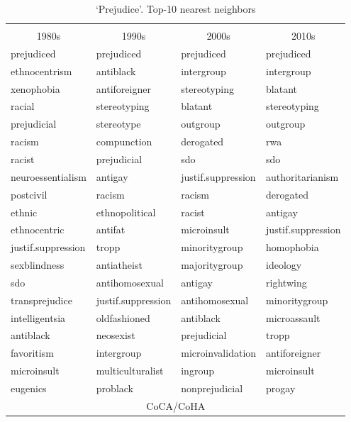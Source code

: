 \documentclass[output=paper]{langsci/langscibook}
\begin{document}
\begin{table}
\footnotesize
\caption{`Prejudice'. Top-10 nearest neighbors\label{tab:prejudice-nns}}
 \begin{tabular}{llll}
  \lsptoprule
\multicolumn{4}{c}{Psychology}\\
\multicolumn{1}{c}{1980s} & \multicolumn{1}{c}{1990s}  & \multicolumn{1}{c}{2000s} & \multicolumn{1}{c}{2010s}\\\midrule
prejudiced&prejudiced&prejudiced&prejudiced                   \\
ethnocentrism&antiblack&intergroup&intergroup                 \\
xenophobia&antiforeigner&stereotyping&blatant                 \\
racial&stereotyping&blatant&stereotyping                      \\
prejudicial&stereotype&outgroup&outgroup                      \\
racism&compunction&derogated&rwa                              \\
racist&prejudicial&sdo&sdo                                    \\
neuroessentialism&antigay&justif.suppression&authoritarianism \\
postcivil&racism&racism&derogated                             \\
ethnic&ethnopolitical&racist&antigay                          \\
ethnocentric&antifat&microinsult&justif.suppression           \\
justif.suppression&tropp&minoritygroup&homophobia             \\
sexblindness&antiatheist&majoritygroup&ideology               \\
sdo&antihomosexual&antigay&rightwing                          \\
transprejudice&justif.suppression&antihomosexual&minoritygroup\\
intelligentsia&oldfashioned&antiblack&microassault            \\
antiblack&neosexist&prejudicial&tropp                         \\
favoritism&intergroup&microinvalidation&antiforeigner         \\
microinsult&multiculturalist&ingroup&microinsult              \\
eugenics&problack&nonprejudicial&progay                       \\\midrule
\multicolumn{4}{c}{CoCA/CoHA}\\

\end{tabular}
\end{table}
\end{document}
